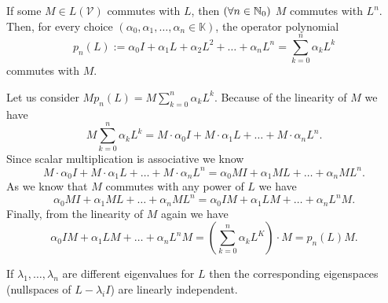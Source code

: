 \documentclass{article}
\begin{document}
\begin{problem}
  If some $M \in L(\mathcal{V})$ commutes with $L$, then $(\forall n \in \mathbb{N}_0)$ $M$ commutes with $L^n$.
  Then, for every choice $(\alpha_0, \alpha_1, \ldots, \alpha_n \in \mathbb{K})$, the operator polynomial
  \[p_n(L) := \alpha_0 I + \alpha_1 L + \alpha_2 L^2 + \ldots + \alpha_n L^n = \sum_{k = 0}^{n} \alpha_k L^k\]
  commutes with $M$.
\end{problem}

\begin{solution}
  Let us consider $M p_n(L) = M \sum_{k = 0}^{n} \alpha_k L^k$.
  Because of the linearity of $M$ we have
  \[M \sum_{k = 0}^{n} \alpha_k L^k = M \cdot \alpha_0 I + M \cdot \alpha_1 L + \ldots + M \cdot \alpha_n L^n.\]
  Since scalar multiplication is associative we know
  \[M \cdot \alpha_0 I + M \cdot \alpha_1 L + \ldots + M \cdot \alpha_n L^n = \alpha_0 M I + \alpha_1 M L + \ldots + \alpha_n M L^n.\]
  As we know that $M$ commutes with any power of $L$ we have
  \[\alpha_0 M I + \alpha_1 M L + \ldots + \alpha_n M L^n = \alpha_0 I M + \alpha_1 L M + \ldots + \alpha_n L^n M.\]
  Finally, from the linearity of $M$ again we have
  \[\alpha_0 I M + \alpha_1 L M + \ldots + \alpha_n L^n M = (\sum_{k = 0}^{n} \alpha_k L^K) \cdot M = p_n(L) M.\]
\end{solution}

\begin{problem}
  If $\lambda_1, \ldots, \lambda_n$ are different eigenvalues for $L$ then the corresponding eigenspaces (nullspaces of $L - \lambda_i I$) are linearly independent.
\end{problem}
\end{document}

